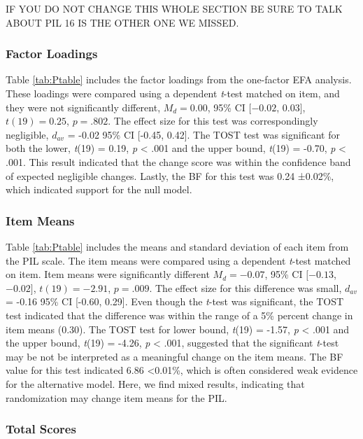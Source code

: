 \documentclass[english,man, mask]{apa6}
\theoremstyle{definition}
\theoremstyle{definition}
\theoremstyle{definition}
\theoremstyle{remark}
\begin{document}
IF YOU DO NOT CHANGE THIS WHOLE SECTION BE SURE TO TALK ABOUT PIL 16 IS
THE OTHER ONE WE MISSED.

\subsubsection{Factor Loadings}\label{factor-loadings}

Table \ref{tab:Ptable} includes the factor loadings from the one-factor
EFA analysis. These loadings were compared using a dependent
\emph{t}-test matched on item, and they were not significantly
different, \(M_d = 0.00\), 95\% CI \([-0.02\), \(0.03]\),
\(t(19) = 0.25\), \(p = .802\). The effect size for this test was
correspondingly negligible, \(d_{av}\) = -0.02 95\% CI {[}-0.45,
0.42{]}. The TOST test was significant for both the lower, \emph{t}(19)
= 0.19, \emph{p} \textless{} .001 and the upper bound, \emph{t}(19) =
-0.70, \emph{p} \textless{} .001. This result indicated that the change
score was within the confidence band of expected negligible changes.
Lastly, the BF for this test was 0.24 ±0.02\%, which indicated support
for the null model.

\subsubsection{Item Means}\label{item-means}

Table \ref{tab:Ptable} includes the means and standard deviation of each
item from the PIL scale. The item means were compared using a dependent
\emph{t}-test matched on item. Item means were significantly different
\(M_d = -0.07\), 95\% CI \([-0.13\), \(-0.02]\), \(t(19) = -2.91\),
\(p = .009\). The effect size for this difference was small, \(d_{av}\)
= -0.16 95\% CI {[}-0.60, 0.29{]}. Even though the \emph{t}-test was
significant, the TOST test indicated that the difference was within the
range of a 5\% percent change in item means (0.30). The TOST test for
lower bound, \emph{t}(19) = -1.57, \emph{p} \textless{} .001 and the
upper bound, \emph{t}(19) = -4.26, \emph{p} \textless{} .001, suggested
that the significant \emph{t}-test may be not be interpreted as a
meaningful change on the item means. The BF value for this test
indicated 6.86 \textless{}0.01\%, which is often considered weak
evidence for the alternative model. Here, we find mixed results,
indicating that randomization may change item means for the PIL.

\subsubsection{Total Scores}\label{total-scores}
\end{document}
